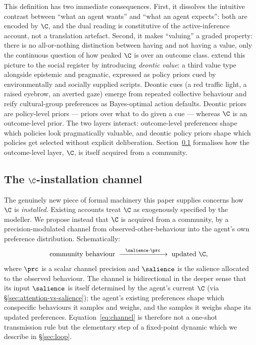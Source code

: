 This definition has two immediate consequences. First, it dissolves the
intuitive contrast between ``what an agent wants'' and ``what an agent
expects'': both are encoded by $\C$, and the dual reading is constitutive of
the active-inference account, not a translation artefact. Second, it makes
``valuing'' a graded property: there is no all-or-nothing distinction between
having and not having a value, only the continuous question of how peaked
$\C$ is over an outcome class. \citet{constant2019Regimes} extend this picture
to the social register by introducing \emph{deontic value}: a third value
type alongside epistemic and pragmatic, expressed as policy priors cued by
environmentally and socially supplied scripts. Deontic cues (a red traffic
light, a raised eyebrow, an averted gaze) emerge from repeated collective
behaviour and reify cultural-group preferences as Bayes-optimal action
defaults. Deontic priors are policy-level priors --- priors over what to do
given a cue --- whereas $\C$ is an outcome-level prior. The two layers
interact: outcome-level preferences shape which policies look pragmatically
valuable, and deontic policy priors shape which policies get selected without
explicit deliberation. Section~\ref{sec:installation} formalises how the
outcome-level layer, $\C$, is itself acquired from a community.

\subsection{The $\C$-installation channel}
\label{sec:installation}

The genuinely new piece of formal machinery this paper supplies concerns how
$\C$ is \emph{installed}. Existing accounts treat $\C$ as exogenously
specified by the modeller. We propose instead that $\C$ is acquired from a
community, by a precision-modulated channel from observed-other-behaviour into
the agent's own preference distribution. Schematically:
\begin{equation}
\label{eq:channel}
\text{community behaviour} \;\xrightarrow{\;\;\;\salience \cdot \prc\;\;\;}\;
\text{updated } \C,
\end{equation}
where $\prc$ is a scalar channel precision and $\salience$ is the salience
allocated to the observed behaviour. The channel is bidirectional in the
deeper sense that its input $\salience$ is itself determined by the agent's
current $\C$ (via \S\ref{sec:attention-vs-salience}); the agent's existing
preferences shape which conspecific behaviours it samples and weighs, and the
samples it weighs shape its updated preferences. Equation~\eqref{eq:channel}
is therefore not a one-shot transmission rule but the elementary step of a
fixed-point dynamic which we describe in \S\ref{sec:loop}.

